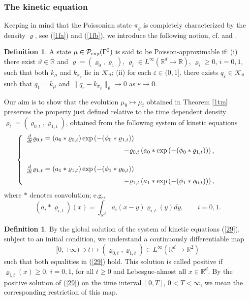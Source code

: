 \documentclass[reqno,11pt]{amsart}
\theoremstyle{definition}
\newtheorem{definition}[theorem]{Definition}
\theoremstyle{remark}
\numberwithin{equation}{section}
\begin{document}
\subsubsection{The kinetic equation}
Keeping in mind that the Poissonian state $\pi_\varrho$ is
completely characterized by the density $\varrho$, see (\ref{1fa})
and (\ref{1fb}), we introduce the following notion, cf. \cite[page
1046]{BKKK} and \cite[page 70]{FKKO}.
\begin{definition}
  \label{Ja1df}
A state $\mu\in \mathcal{P}_{\rm exp}(\Gamma^2)$ is said to be
Poisson-approximable if: (i)  there exist  $\vartheta\in \mathds{R}$
and $\varrho = (\varrho_0, \varrho_1)$, $\varrho_i \in L^\infty(
\mathds{R}^d \to \mathds{R})$, $\varrho_i \geq 0$, $i=0,1$, such
that both $k_\mu$ and $k_{\pi_\varrho}$ lie in
$\mathcal{K}_\vartheta$; (ii) for each $\varepsilon \in (0,1]$,
there exists $q_\varepsilon \in \mathcal{K}_\vartheta$ such that
$q_1 = k_\mu$ and $\|q_\varepsilon - k_{\pi_\varrho}\|_\vartheta \to
0$ as $\varepsilon \to 0$.
\end{definition}
Our aim is to show that the evolution $\mu_0 \mapsto \mu_t$ obtained
in Theorem \ref{1tm} preserves the property just defined relative to
the time dependent density $\varrho_t = (\varrho_{0,t},
\varrho_{1,t})$, obtained from the following system of kinetic
equations
\begin{eqnarray}
  \label{29}
  \left\{\begin{array}{ll}
\frac{d}{dt} \varrho_{0,t}  =(a_0 \ast \varrho_{0,t}) \exp\left(
- (\phi_0 \ast \varrho_{1,t})\right) \\[.2cm] \hskip5cm   - \varrho_{0,t} \left( a_0
\ast
\exp\left( - (\phi_0 \ast \varrho_{1,t})\right) \right),  \\[.5cm]
\frac{d}{dt} \varrho_{1,t} = (a_1 \ast \varrho_{1,t}) \exp\left( -
(\phi_1 \ast \varrho_{0,t})\right)\\[.2cm] \hskip5cm - \varrho_{1,t} \left( a_1 \ast
\exp\left( - (\phi_1 \ast \varrho_{0,t})\right) \right), \end{array}
\right. \qquad \quad
\end{eqnarray}
where $\ast$ denotes convolution; e.g.,
\begin{equation*}
 
  (a_i \ast \varrho_{i,t}) (x) = \int_{\mathds{R}^d} a_i (x-y)
  \varrho_{i,t} (y) d y, \qquad i=0,1.
\end{equation*}
\begin{definition}
  \label{Sksf}
By the global solution of the system of kinetic equations
(\ref{29}), subject to an initial condition,  we understand a
continuously differentiable map
\begin{equation}
  \label{40}
[0, +\infty) \ni t \mapsto (\varrho_{0,t}, \varrho_{1,t}) \in
L^\infty (\mathds{R}^d \to \mathds{R}^2)
\end{equation}
such that both equalities in (\ref{29}) hold. This solution is
called positive if $\varrho_{i,t}(x) \geq 0$, $i=0,1$, for all
$t\geq 0$ and Lebesgue-almost all $x\in \mathds{R}^d$. By the
positive solution of (\ref{29}) on the time interval $[0,T]$,
$0<T<\infty$, we mean the corresponding restriction of this map.
\end{definition}
\end{document}
